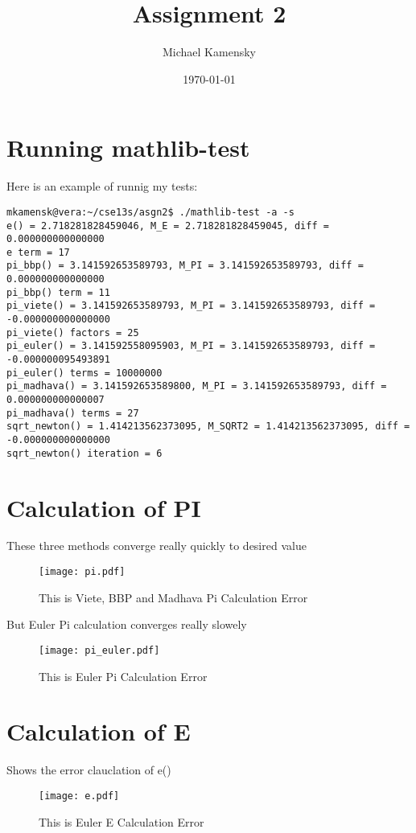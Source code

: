 \documentclass[11pt]{article} %
\title{Assignment 2}
\author{Michael Kamensky}
\date{\today} %
\begin{document}
\maketitle %
\section{Running mathlib-test}
Here is an example of runnig my tests:

\begin{verbatim} 
mkamensk@vera:~/cse13s/asgn2$ ./mathlib-test -a -s
e() = 2.718281828459046, M_E = 2.718281828459045, diff = 0.000000000000000
e term = 17
pi_bbp() = 3.141592653589793, M_PI = 3.141592653589793, diff = 0.000000000000000
pi_bbp() term = 11
pi_viete() = 3.141592653589793, M_PI = 3.141592653589793, diff = -0.000000000000000
pi_viete() factors = 25
pi_euler() = 3.141592558095903, M_PI = 3.141592653589793, diff = -0.000000095493891
pi_euler() terms = 10000000
pi_madhava() = 3.141592653589800, M_PI = 3.141592653589793, diff = 0.000000000000007
pi_madhava() terms = 27
sqrt_newton() = 1.414213562373095, M_SQRT2 = 1.414213562373095, diff = -0.000000000000000
sqrt_newton() iteration = 6
\end{verbatim}
\section{Calculation of PI}
These three methods converge really quickly to desired value
\begin{figure}[H]
\begin{center}
\texttt{[image: pi.pdf]}
\caption{This is Viete, BBP and Madhava Pi Calculation Error}
\end{center}
\end{figure}

But Euler Pi calculation converges really slowely
\begin{figure}[H]
\begin{center}
\texttt{[image: pi\_euler.pdf]}
\caption{This is Euler Pi Calculation Error}
\end{center}
\end{figure}

\section{Calculation of E}
Shows the error clauclation of e()
\begin{figure}[H]
\begin{center}
\texttt{[image: e.pdf]}
\caption{This is Euler E Calculation Error}
\end{center}
\end{figure}
\end{document}
